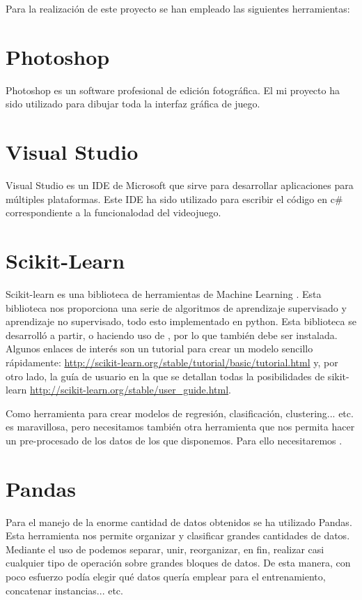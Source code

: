 
Para la realización de este proyecto se han empleado las siguientes herramientas:

\section{Photoshop}
Photoshop es un software profesional de edición fotográfica. El mi proyecto ha sido utilizado para dibujar toda la interfaz gráfica de juego.

\section{Visual Studio}
Visual Studio  es un IDE de Microsoft que sirve para desarrollar aplicaciones para múltiples plataformas. Este IDE ha sido utilizado para escribir el código en c\# correspondiente a la funcionalodad del videojuego.

\section{Scikit-Learn}
 Scikit-learn es una biblioteca de herramientas de Machine Learning \cite{scikit}. Esta biblioteca nos proporciona una serie de algoritmos de aprendizaje supervisado y aprendizaje no supervisado, todo esto implementado en python. Esta biblioteca se desarrolló a partir, o haciendo uso de , por lo que también debe ser instalada. Algunos enlaces de interés son un tutorial para crear un modelo sencillo rápidamente: \url{http://scikit-learn.org/stable/tutorial/basic/tutorial.html} y, por otro lado, la guía de usuario en la que se detallan todas la posibilidades de sikit-learn \url{http://scikit-learn.org/stable/user_guide.html}.

Como herramienta para crear modelos de regresión, clasificación, clustering... etc. es maravillosa, pero necesitamos también otra herramienta que nos permita hacer un pre-procesado de los datos de los que disponemos. Para ello necesitaremos .

\section{Pandas}
Para el manejo de la enorme cantidad de datos obtenidos se ha utilizado Pandas. Esta herramienta nos permite organizar y clasificar grandes cantidades de datos\cite{mckinney-proc-scipy-2010, mckinney-proc-scipy-2011}. Mediante el uso de  podemos separar, unir, reorganizar, en fin, realizar casi cualquier tipo de operación sobre grandes bloques de datos. De esta manera, con poco esfuerzo podía elegir qué datos quería emplear para el entrenamiento, concatenar instancias... etc.

